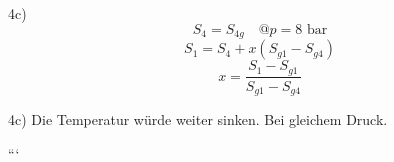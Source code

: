 4c) 
\[
S_{4} = S_{4g} \quad @ p = 8 \text{ bar}
\]
\[
S_{1} = S_{4} + x (S_{g1} - S_{g4})
\]
\[
x = \frac{S_{1} - S_{g1}}{S_{g1} - S_{g4}}
\]

4c) 
Die Temperatur würde weiter sinken. Bei gleichem Druck.

```